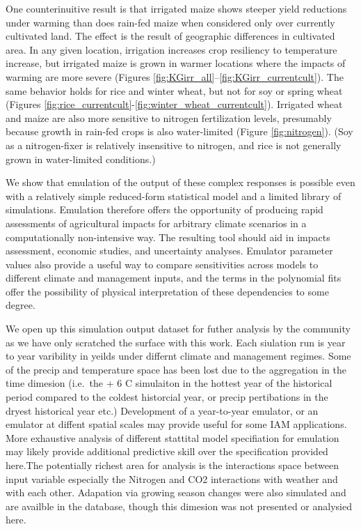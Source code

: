 \documentclass[preprint, 5p, times, twocolumn]{elsarticle}
\begin{document}
One counterinuitive result is that irrigated maize shows steeper yield reductions under warming than does rain-fed maize when considered only over currently cultivated land. The effect is the result of geographic differences in cultivated area. In any given location, irrigation increases crop resiliency to temperature increase, but irrigated maize is grown in warmer locations where the impacts of warming are more severe (Figures \ref{fig:KGirr_all}--\ref{fig:KGirr_currentcult}). The same behavior holds for rice and winter wheat, but not for soy or spring wheat (Figures \ref{fig:rice_currentcult}-\ref{fig:winter_wheat_currentcult}). Irrigated wheat and maize are also more sensitive to nitrogen fertilization levels, presumably because growth in rain-fed crops is also water-limited (Figure \ref{fig:nitrogen}). (Soy as a nitrogen-fixer is relatively insensitive to nitrogen, and rice is not generally grown in water-limited conditions.)

We show that emulation of the output of these complex responses is possible even with a relatively simple reduced-form statistical model and a limited library of simulations. Emulation therefore offers the opportunity of producing rapid assessments of agricultural impacts for arbitrary climate scenarios in a computationally non-intensive way. The resulting tool should aid in impacts assessment, economic studies, and uncertainty analyses. Emulator parameter values also provide a useful way to compare sensitivities across models to different climate and management inputs, and the terms in the polynomial fits offer the possibility of physical interpretation of these dependencies to some degree.

We open up this simulation output dataset for futher analysis by the community as we have only scratched the surface with this work. Each siulation run is year to year varibility in yeilds under differnt climate and management regimes. Some of the precip and temperature space has been lost due to the aggregation in the time dimesion (i.e.\ the + 6 C simulaiton in the hottest year of the historical period compared to the coldest historcial year, or precip pertibations in the dryest historical year etc.) Development of a year-to-year emulator, or an emulator at diffent spatial scales may provide useful for some IAM applications. More exhaustive analysis of different stattital model specifiation for emulation may likely provide additional predictive skill over the specification provided here.The potentially richest area for analysis is the interactions space between input variable especially the Nitrogen and CO2 interactions with weather and with each other. Adapation via growing season changes were also simulated and are availble in the database, though this dimesion was not presented or analysied here.
\end{document}
